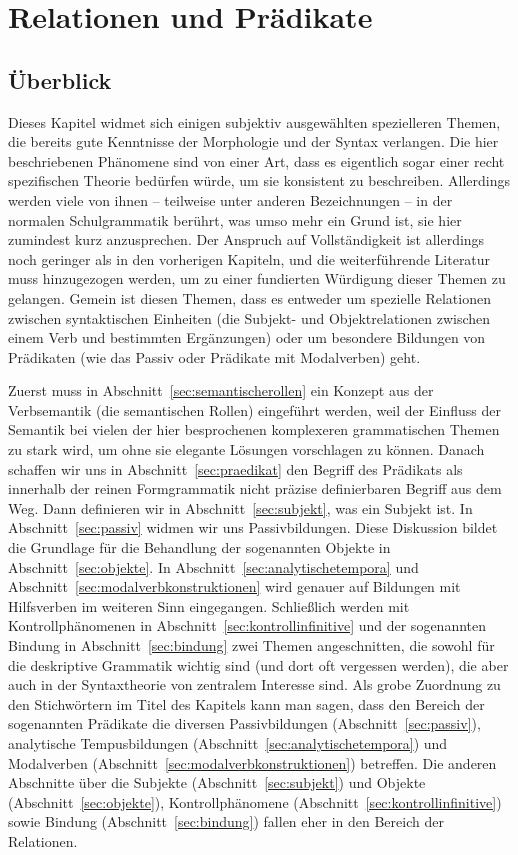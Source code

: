 \chapter{Relationen und Prädikate}

\label{sec:relationenpraedikate}

\section{Überblick}

Dieses Kapitel widmet sich einigen subjektiv ausgewählten spezielleren Themen, die bereits gute Kenntnisse der Morphologie und der Syntax verlangen.
Die hier beschriebenen Phänomene sind von einer Art, dass es eigentlich sogar einer recht spezifischen Theorie bedürfen würde, um sie konsistent zu beschreiben.
Allerdings werden viele von ihnen -- teilweise unter anderen Bezeichnungen -- in der normalen Schulgrammatik berührt, was umso mehr ein Grund ist, sie hier zumindest kurz anzusprechen.
Der Anspruch auf Vollständigkeit ist allerdings noch geringer als in den vorherigen Kapiteln, und die weiterführende Literatur muss hinzugezogen werden, um zu einer fundierten Würdigung dieser Themen zu gelangen.
Gemein ist diesen Themen, dass es entweder um spezielle Relationen zwischen syntaktischen Einheiten (\zB die Subjekt- und Objektrelationen zwischen einem Verb und bestimmten Ergänzungen) oder um besondere Bildungen von Prädikaten (wie \zB das Passiv oder Prädikate mit Modalverben) geht.

Zuerst muss in Abschnitt~\ref{sec:semantischerollen} ein Konzept aus der Verbsemantik (die semantischen Rollen) eingeführt werden, weil der Einfluss der Semantik bei vielen der hier besprochenen komplexeren grammatischen Themen zu stark wird, um ohne sie elegante Lösungen vorschlagen zu können.
Danach schaffen wir uns in Abschnitt~\ref{sec:praedikat} den Begriff des Prädikats als innerhalb der reinen Formgrammatik nicht präzise definierbaren Begriff aus dem Weg.
Dann definieren wir in Abschnitt~\ref{sec:subjekt}, was ein Subjekt ist.
In Abschnitt~\ref{sec:passiv} widmen wir uns Passivbildungen.
Diese Diskussion bildet die Grundlage für die Behandlung der sogenannten Objekte in Abschnitt~\ref{sec:objekte}.
In Abschnitt~\ref{sec:analytischetempora} und Abschnitt~\ref{sec:modalverbkonstruktionen} wird genauer auf Bildungen mit Hilfsverben im weiteren Sinn eingegangen.
Schließlich werden mit Kontrollphänomenen in Abschnitt~\ref{sec:kontrollinfinitive} und der sogenannten Bindung in Abschnitt~\ref{sec:bindung} zwei Themen angeschnitten, die sowohl für die deskriptive Grammatik wichtig sind (und dort oft vergessen werden), die aber auch in der Syntaxtheorie von zentralem Interesse sind.
Als grobe Zuordnung zu den Stichwörtern im Titel des Kapitels kann man sagen, dass den Bereich der sogenannten Prädikate die diversen Passivbildungen (Abschnitt~\ref{sec:passiv}), analytische Tempusbildungen (Abschnitt~\ref{sec:analytischetempora}) und Modalverben (Abschnitt~\ref{sec:modalverbkonstruktionen}) betreffen.
Die anderen Abschnitte über die Subjekte (Abschnitt~\ref{sec:subjekt}) und Objekte (Abschnitt~\ref{sec:objekte}), Kontrollphänomene (Abschnitt~\ref{sec:kontrollinfinitive}) sowie Bindung (Abschnitt~\ref{sec:bindung}) fallen eher in den Bereich der Relationen.

